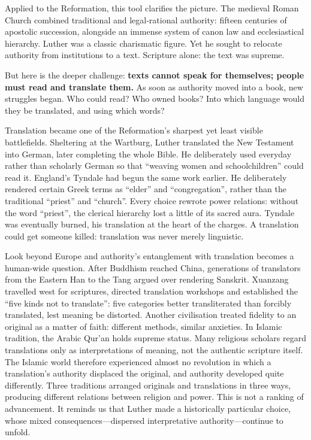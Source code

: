 Applied to the Reformation, this tool clarifies the picture. The medieval Roman Church combined traditional and legal-rational authority: fifteen centuries of apostolic succession, alongside an immense system of canon law and ecclesiastical hierarchy. Luther was a classic charismatic figure. Yet he sought to relocate authority from institutions to a text. Scripture alone: the text was supreme.

But here is the deeper challenge: \textbf{texts cannot speak for themselves; people must read and translate them.} As soon as authority moved into a book, new struggles began. Who could read? Who owned books? Into which language would they be translated, and using which words?

Translation became one of the Reformation's sharpest yet least visible battlefields. Sheltering at the Wartburg, Luther translated the New Testament into German, later completing the whole Bible. He deliberately used everyday rather than scholarly German so that ``weaving women and schoolchildren'' could read it. England's Tyndale had begun the same work earlier. He deliberately rendered certain Greek terms as ``elder'' and ``congregation'', rather than the traditional ``priest'' and ``church''. Every choice rewrote power relations: without the word ``priest'', the clerical hierarchy lost a little of its sacred aura. Tyndale was eventually burned, his translation at the heart of the charges. A translation could get someone killed: translation was never merely linguistic.

Look beyond Europe and authority's entanglement with translation becomes a human-wide question. After Buddhism reached China, generations of translators from the Eastern Han to the Tang argued over rendering Sanskrit. Xuanzang travelled west for scriptures, directed translation workshops and established the ``five kinds not to translate'': five categories better transliterated than forcibly translated, lest meaning be distorted. Another civilisation treated fidelity to an original as a matter of faith: different methods, similar anxieties. In Islamic tradition, the Arabic Qur'an holds supreme status. Many religious scholars regard translations only as interpretations of meaning, not the authentic scripture itself. The Islamic world therefore experienced almost no revolution in which a translation's authority displaced the original, and authority developed quite differently. Three traditions arranged originals and translations in three ways, producing different relations between religion and power. This is not a ranking of advancement. It reminds us that Luther made a historically particular choice, whose mixed consequences---dispersed interpretative authority---continue to unfold.

